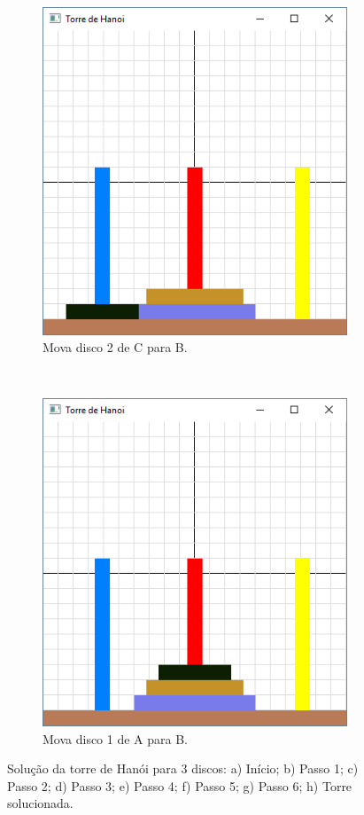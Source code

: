 \begin{figure}[H]
\begin{subfigure}[t]{.25\textwidth}
    \includegraphics[scale=0.3]{img/hanoi_4g}
    \caption{Mova disco 2 de C para B.} 
  \end{subfigure}
  ~
  \begin{subfigure}[t]{.25\textwidth}
    \includegraphics[scale=0.3]{img/hanoi_4h}
    \caption{Mova disco 1 de A para B.} 
  \end{subfigure}

  \caption{Solução da torre de Hanói para 3 discos: a) Início; b) Passo 1; c) Passo 2; d) Passo 3; e) Passo 4; f) Passo 5; g) Passo 6; h) Torre solucionada.} \label{fig:hanoicompleto}
\end{figure}
















